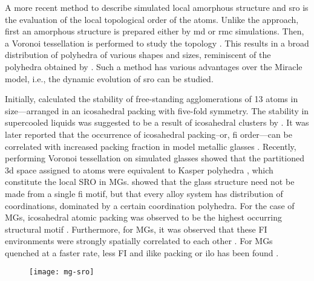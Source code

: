 A more recent method to describe simulated local amorphous structure and \gls{sro} is the evaluation of the local topological order of the atoms. Unlike the \textcite{Miracle2004,Miracle2013} approach, first an amorphous structure is prepared either by \gls{md} or \gls{rmc} simulations. Then, a Voronoi tessellation is performed to study the topology \cite{Sheng2006,Fukunaga2006}. This results in a broad distribution of polyhedra of various shapes and sizes, reminiscent of the polyhedra obtained by \textcite{Bernal1959}. Such a method has various advantages over the Miracle model, i.e., the dynamic evolution of \gls{sro} can be studied. \par

Initially, \textcite{Honeycutt1987} calculated the stability of free-standing agglomerations of 13 atoms in size—arranged in an icosahedral packing with five-fold symmetry. The stability in supercooled liquids was suggested to be a result of icosahedral clusters by \textcite{Frank1952}. It was later reported that the occurrence of icosahedral packing–or, \gls{fi} order---can be correlated with increased packing fraction in model metallic glasses \cite{Clarke1993}. Recently, performing Voronoi tessellation on simulated glasses \cite{Sheng2006,Fukunaga2006} showed that the partitioned \gls{3d} space assigned to atoms were equivalent to Kasper polyhedra \cite{Frank1958,Doye1996}, which constitute the local SRO in MGs. \textcite{Sheng2006} showed that the glass structure need not be made from a single \gls{fi} motif, but that every alloy system has distribution of coordinations, dominated by a certain coordination polyhedra. For the case of \czsix MGs, icosahedral atomic packing was observed to be the highest occurring structural motif \cite{Ding2014,Ding2014a}. Furthermore, for \cz MGs, it was observed that these FI environments were strongly spatially correlated to each other \cite{Peng2010,Li2009a}. For \cz MGs quenched at a faster rate, less FI and \gls{ilike} packing or \gls{ilo} has been found \cite{Yue2018}. \par 

\begin{figure}[!h] \centering
	\texttt{[image: mg-sro]}
	\label{f:voro-sro-mg}
\end{figure}

